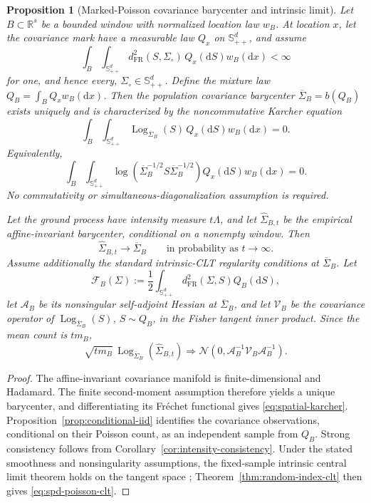 \documentclass[11pt,a4paper]{article}
\newtheorem{proposition}[theorem]{Proposition}
\theoremstyle{remark}
\newcommand{\R}{\mathbb R}
\newcommand{\Spp}[1]{\mathbb S_{++}^{#1}}
\newcommand{\Log}{\operatorname{Log}}
\begin{document}
\begin{proposition}[Marked-Poisson covariance barycenter and intrinsic limit]
\label{prop:spd-clt}
Let \(B\subset\R^s\) be a bounded window with normalized location law \(w_B\).  At location \(x\), let the covariance mark have a measurable law \(Q_x\) on \(\Spp{d}\), and assume
\[
 \int_B\int_{\Spp{d}}
 d_{\mathrm{FR}}^2(S,\Sigma_\circ)\,Q_x(\mathrm dS)w_B(\mathrm dx)<\infty
\]
for one, and hence every, \(\Sigma_\circ\in\Spp{d}\).  Define the mixture law \(Q_B=\int_BQ_xw_B(\mathrm dx)\).  Then the population covariance barycenter \(\overline\Sigma_B=b(Q_B)\) exists uniquely and is characterized by the noncommutative Karcher equation
\begin{equation}
\label{eq:spatial-karcher}
 \int_B\int_{\Spp{d}}
 \Log_{\overline\Sigma_B}(S)\,Q_x(\mathrm dS)w_B(\mathrm dx)=0.
\end{equation}
Equivalently,
\[
 \int_B\int_{\Spp{d}}
 \log\!\left(\overline\Sigma_B^{-1/2}S\overline\Sigma_B^{-1/2}\right)
 Q_x(\mathrm dS)w_B(\mathrm dx)=0.
\]
No commutativity or simultaneous-diagonalization assumption is required.

Let the ground process have intensity measure \(t\Lambda\), and let \(\widehat\Sigma_{B,t}\) be the empirical affine-invariant barycenter, conditional on a nonempty window.  Then
\[
 \widehat\Sigma_{B,t}\longrightarrow\overline\Sigma_B
 \qquad\text{in probability as }t\to\infty.
\]
Assume additionally the standard intrinsic-CLT regularity conditions at \(\overline\Sigma_B\).  Let
\[
 \mathcal F_B(\Sigma):=\frac12\int_{\Spp{d}}d_{\mathrm{FR}}^2(\Sigma,S)Q_B(\mathrm dS),
\]
let \(\mathcal A_B\) be its nonsingular self-adjoint Hessian at \(\overline\Sigma_B\), and let \(\mathcal V_B\) be the covariance operator of \(\Log_{\overline\Sigma_B}(S)\), \(S\sim Q_B\), in the Fisher tangent inner product.  Since the mean count is \(tm_B\),
\begin{equation}
\label{eq:spd-poisson-clt}
 \sqrt{tm_B}\,\Log_{\overline\Sigma_B}(\widehat\Sigma_{B,t})
 \Rightarrow
 \mathcal N\!\left(0,\mathcal A_B^{-1}\mathcal V_B\mathcal A_B^{-1}\right).
\end{equation}
\end{proposition}

\begin{proof}
The affine-invariant covariance manifold is finite-dimensional and Hadamard.  The finite second-moment assumption therefore yields a unique barycenter, and differentiating its Fr\'echet functional gives \eqref{eq:spatial-karcher}.  Proposition~\ref{prop:conditional-iid} identifies the covariance observations, conditional on their Poisson count, as an independent sample from \(Q_B\).  Strong consistency follows from Corollary~\ref{cor:intensity-consistency}.  Under the stated smoothness and nonsingularity assumptions, the fixed-sample intrinsic central limit theorem holds on the tangent space \cite{bhattacharya2003,bhattacharya2005,pennec2006}; Theorem~\ref{thm:random-index-clt} then gives \eqref{eq:spd-poisson-clt}.
\end{proof}
\end{document}
